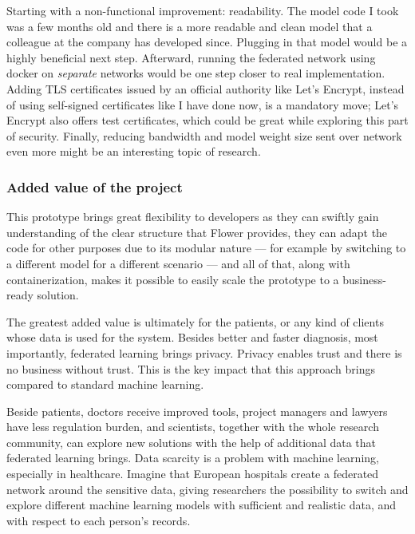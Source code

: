 
Starting with a non-functional improvement: readability. The model code I took was a few months old and there is a more readable and clean model that a colleague at the company has developed since. Plugging in that model would be a highly beneficial next step. Afterward, running the federated network using docker on \emph{separate} networks would be one step closer to real implementation. Adding TLS certificates issued by an official authority like Let's Encrypt, instead of using self-signed certificates like I have done now, is a mandatory move; Let's Encrypt also offers test certificates, which could be great while exploring this part of security. Finally, reducing bandwidth and model weight size sent over network even more might be an interesting topic of research.


\subsubsection{Added value of the project}


This prototype brings great flexibility to developers as they can swiftly gain understanding of the clear structure that Flower provides, they can adapt the code for other purposes due to its modular nature --- for example by switching to a different model for a different scenario --- and all of that, along with containerization, makes it possible to easily scale the prototype to a business-ready solution.

The greatest added value is ultimately for the patients, or any kind of clients whose data is used for the system. Besides better and faster diagnosis, most importantly, federated learning brings privacy. Privacy enables trust and there is no business without trust. This is the key impact that this approach brings compared to standard machine learning.

Beside patients, doctors receive improved tools, project managers and lawyers have less regulation burden, and scientists, together with the whole research community, can explore new solutions with the help of additional data that federated learning brings. Data scarcity is a problem with machine learning, especially in healthcare. Imagine that European hospitals create a federated network around the sensitive data, giving researchers the possibility to switch and explore different machine learning models with sufficient and realistic data, and with respect to each person's records.


